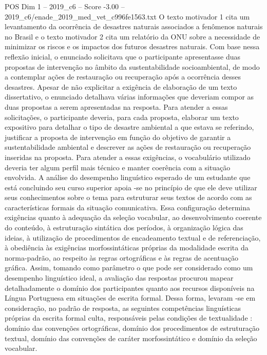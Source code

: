 \begin{textsample}{POS Dim 1 – 2019\_c6 – Score -3.00 – 2019\_c6/enade\_2019\_med\_vet\_c996fe1563.txt}
O texto motivador 1 cita um levantamento da ocorrência de desastres naturais associados a fenômenos naturais no Brasil e o texto motivador 2 cita um relatório da ONU sobre a necessidade de minimizar os riscos e os impactos dos futuros desastres naturais.
Com base nessa reflexão inicial, o enunciado solicitava que o participante apresentasse duas propostas de intervenção no âmbito da sustentabilidade socioambiental, de modo a contemplar ações de restauração ou recuperação após a ocorrência desses desastres.
Apesar de não explicitar a exigência de elaboração de um texto dissertativo, o enunciado detalhava várias informações que deveriam compor as duas propostas a serem apresentadas na resposta.
Para atender a essas solicitações, o participante deveria, para cada proposta, elaborar um texto expositivo para detalhar o tipo de desastre ambiental a que estava se referindo, justificar a proposta de intervenção em função do objetivo de garantir a sustentabilidade ambiental e descrever as ações de restauração ou recuperação inseridas na proposta.
Para atender a essas exigências, o vocabulário utilizado deveria ter algum perfil mais técnico e manter coerência com a situação envolvida.
A análise do desempenho linguístico esperado de um estudante que está concluindo seu curso superior apoia -se no princípio de que ele deve utilizar seus conhecimentos sobre o tema para estruturar seus textos de acordo com as características formais da situação comunicativa.
Essa configuração determina exigências quanto à adequação da seleção vocabular, ao desenvolvimento coerente do conteúdo, à estruturação sintática dos períodos, à organização lógica das ideias, à utilização de procedimentos de encadeamento textual e de referenciação, à obediência às exigências morfossintáticas próprias da modalidade escrita da norma-padrão, ao respeito às regras ortográficas e às regras de acentuação gráfica.
Assim, tomando como parâmetro o que pode ser considerado como um desempenho linguístico ideal, a avaliação das respostas procurou mapear detalhadamente o domínio dos participantes quanto aos recursos disponíveis na Língua Portuguesa em situações de escrita formal.
Dessa forma, levaram -se em consideração, no padrão de resposta, as seguintes competências linguísticas próprias da escrita formal culta, responsáveis pelas condições de textualidade : domínio das convenções ortográficas, domínio dos procedimentos de estruturação textual, domínio das convenções de caráter morfossintático e domínio da seleção vocabular.

\end{textsample}
